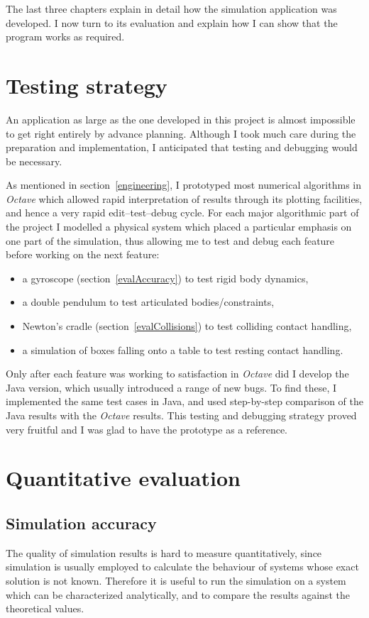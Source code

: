 The last three chapters explain in detail how the simulation application was developed. I now
turn to its evaluation and explain how I can show that the program works as required.

\section{Testing strategy}

An application as large as the one developed in this project is almost impossible to get right
entirely by advance planning. Although I took much care during the preparation and implementation,
I anticipated that testing and debugging would be necessary.

As mentioned in section~\ref{engineering}, I prototyped most numerical algorithms in
\textsl{Octave} which allowed rapid interpretation of results through its plotting facilities,
and hence a very rapid edit--test--debug cycle. For each major algorithmic part of the project
I modelled a physical system which placed a particular emphasis on one part of the simulation,
thus allowing me to test and debug each feature before working on the next feature:
\begin{itemize}
\item a gyroscope (section~\ref{evalAccuracy}) to test rigid body dynamics,
\item a double pendulum to test articulated bodies/constraints,
\item Newton's cradle (section~\ref{evalCollisions}) to test colliding contact handling,
\item a simulation of boxes falling onto a table to test resting contact handling.
\end{itemize}

Only after each feature was working to satisfaction in \textsl{Octave} did I develop the Java
version, which usually introduced a range of new bugs. To find these, I implemented the same
test cases in Java, and used step-by-step comparison of the Java results with the \textsl{Octave}
results. This testing and debugging strategy proved very fruitful and I was glad to have the
prototype as a reference.


\section{Quantitative evaluation}
\subsection{Simulation accuracy\label{evalAccuracy}}
The quality of simulation results is hard to measure quantitatively, since simulation is usually
employed to calculate the behaviour of systems whose exact solution is not known. Therefore it is
useful to run the simulation on a system which can be characterized analytically, and to compare
the results against the theoretical values.


